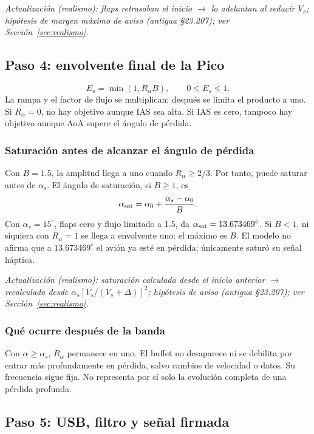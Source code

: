 \documentclass[11pt,a4paper]{article}
\begin{document}
\textit{Actualización (realismo): flaps retrasaban el inicio $\rightarrow$ lo adelantan al reducir $V_s$; hipótesis de margen máximo de aviso (antigua §23.207); ver Sección~\ref{sec:realismo}.}

\subsection{Paso 4: envolvente final de la Pico}
\begin{equation}
E_s=\min(1,R_\alpha B),\qquad 0\le E_s\le1.
\label{eq:stall-envelope}
\end{equation}
La rampa y el factor de flujo se multiplican; después se limita el producto a uno. Si $R_\alpha=0$, no hay objetivo aunque IAS sea alta. Si IAS es cero, tampoco hay objetivo aunque AoA supere el ángulo de pérdida.

\subsubsection{Saturación antes de alcanzar el ángulo de pérdida}
Con $B=1.5$, la amplitud llega a uno cuando $R_\alpha\ge2/3$. Por tanto, puede saturar antes de $\alpha_s$. El ángulo de saturación, si $B\ge1$, es
\begin{equation}
\alpha_{\rm sat}=\alpha_0+\frac{\alpha_s-\alpha_0}{B}.
\end{equation}
Con $\alpha_s=15^\circ$, flaps cero y flujo limitado a 1.5, da $\alpha_{\rm sat}=13.673469^\circ$. Si $B<1$, ni siquiera con $R_\alpha=1$ se llega a envolvente uno: el máximo es $B$. El modelo no afirma que a $13.673469^\circ$ el avión ya esté en pérdida; únicamente saturó su señal háptica.

\textit{Actualización (realismo): saturación calculada desde el inicio anterior $\rightarrow$ recalculada desde $\alpha_s[V_s/(V_s+\Delta)]^2$; hipótesis de aviso (antigua §23.207); ver Sección~\ref{sec:realismo}.}

\subsubsection{Qué ocurre después de la banda}
Con $\alpha\ge\alpha_s$, $R_\alpha$ permanece en uno. El buffet no desaparece ni se debilita por entrar más profundamente en pérdida, salvo cambios de velocidad o datos. Su frecuencia sigue fija. No representa por sí solo la evolución completa de una pérdida profunda.

\subsection{Paso 5: USB, filtro y señal firmada}
\end{document}
